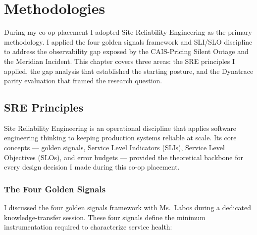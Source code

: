 ﻿%

\chapter{Methodologies}
\label{chap:methodologies}

During my co-op placement I adopted Site Reliability Engineering as the primary
methodology. I applied the four golden signals framework and SLI/SLO discipline
to address the observability gap exposed by the CAIS-Pricing Silent Outage and
the Meridian Incident. This chapter covers three areas: the SRE principles I
applied, the gap analysis that established the starting posture, and the
Dynatrace parity evaluation that framed the research question.


\FloatBarrier

\section{SRE Principles}
\label{sec:sre_principles}


Site Reliability Engineering is an operational discipline that applies
software engineering thinking to keeping production systems reliable at scale.
Its core concepts --- golden signals, Service Level Indicators (SLIs),
Service Level Objectives (SLOs), and error budgets --- provided the theoretical
backbone for every design decision I made during this co-op placement.

\subsection{The Four Golden Signals}

I discussed the four golden signals framework with Ms.\ Labos during a
dedicated knowledge-transfer session. These four signals define the minimum
instrumentation required to characterize service health:

